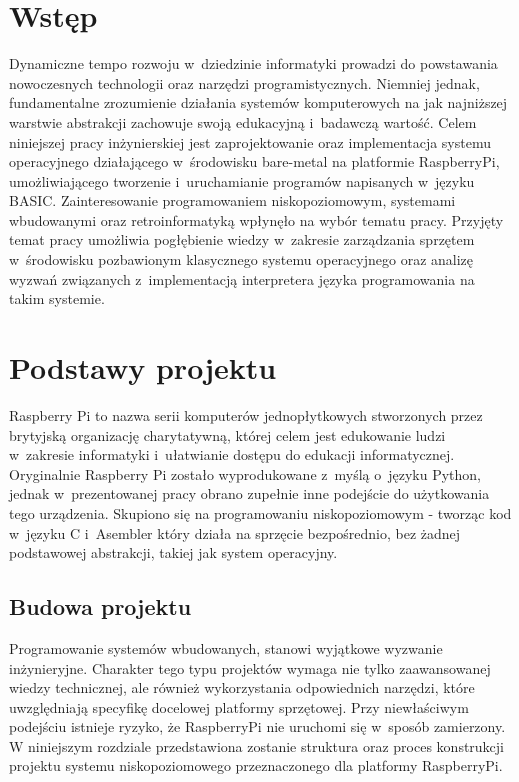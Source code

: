 \documentclass[shortabstract]{iithesis}
\author         {Aleksandra Kosińska \and Cezary Stajszczyk}
\date           {31 sierpnia 2023}                     %
\begin{document}

\chapter*{Wstęp}
Dynamiczne tempo rozwoju w~dziedzinie informatyki prowadzi do powstawania nowoczesnych technologii oraz narzędzi programistycznych. Niemniej jednak, fundamentalne zrozumienie działania systemów komputerowych na jak najniższej warstwie abstrakcji zachowuje swoją edukacyjną i~badawczą wartość.
Celem niniejszej pracy inżynierskiej jest zaprojektowanie oraz implementacja systemu operacyjnego działającego w~środowisku bare-metal na platformie RaspberryPi, umożliwiającego tworzenie i~uruchamianie programów napisanych w~języku BASIC. Zainteresowanie programowaniem niskopoziomowym, systemami wbudowanymi oraz retroinformatyką wpłynęło na wybór tematu pracy.
Przyjęty temat pracy umożliwia pogłębienie wiedzy w~zakresie zarządzania sprzętem w~środowisku pozbawionym klasycznego systemu operacyjnego oraz analizę wyzwań związanych z~implementacją interpretera języka programowania na takim systemie.


\chapter{Podstawy projektu}
Raspberry Pi to nazwa serii komputerów jednopłytkowych stworzonych przez brytyjską organizację charytatywną, której celem jest edukowanie ludzi w~zakresie informatyki i~ułatwianie dostępu do edukacji informatycznej. Oryginalnie Raspberry Pi zostało wyprodukowane z~myślą o~języku Python, jednak w~prezentowanej pracy obrano zupełnie inne podejście do użytkowania tego urządzenia. Skupiono się na programowaniu niskopoziomowym - tworząc kod w~języku C i~Asembler który działa na sprzęcie bezpośrednio, bez żadnej podstawowej abstrakcji, takiej jak system operacyjny.

\section{Budowa projektu}
Programowanie systemów wbudowanych, stanowi wyjątkowe wyzwanie inżynieryjne. Charakter tego typu projektów wymaga nie tylko zaawansowanej wiedzy technicznej, ale również wykorzystania odpowiednich narzędzi, które uwzględniają specyfikę docelowej platformy sprzętowej. Przy niewłaściwym podejściu istnieje ryzyko, że RaspberryPi nie uruchomi się w~sposób zamierzony. W niniejszym rozdziale przedstawiona zostanie struktura oraz proces konstrukcji projektu systemu niskopoziomowego przeznaczonego dla platformy RaspberryPi.
\end{document}
